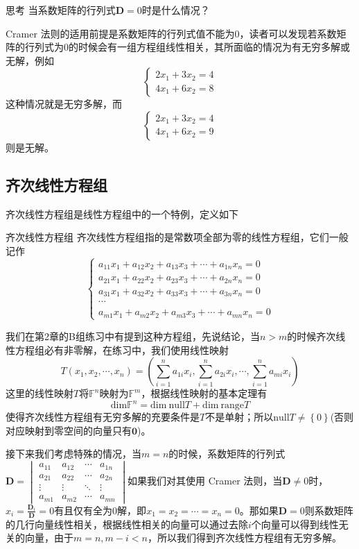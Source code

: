 \begin{ascolorbox1}{思考}
	当系数矩阵的行列式$\mathbf{D}=0$时是什么情况？
\end{ascolorbox1}

Cramer 法则的适用前提是系数矩阵的行列式值不能为0，读者可以发现若系数矩阵的行列式为0的时候会有一组方程组线性相关，其所面临的情况为有无穷多解或无解，例如$$\left\{\begin{matrix} 
	2x_1+3x_2 = 4 \\  
	4x_1+6x_2 = 8
  \end{matrix}\right. $$这种情况就是无穷多解，而$$\left\{\begin{matrix} 
	2x_1+3x_2 = 4 \\  
	4x_1+6x_2 = 9
  \end{matrix}\right. $$则是无解。

\subsection{齐次线性方程组}

齐次线性方程组是线性方程组中的一个特例，定义如下
\begin{definition}{齐次线性方程组}
	齐次线性方程组指的是常数项全部为零的线性方程组，它们一般记作$$\left\{\begin{matrix} 
		a_{11}x_1+a_{12}x_2+a_{13}x_3+\cdots+a_{1n}x_n=0 \\  
		a_{21}x_1+a_{22}x_2+a_{23}x_3+\cdots+a_{2n}x_n=0 \\  
		a_{31}x_1+a_{32}x_2+a_{33}x_3+\cdots+a_{3n}x_n=0 \\
		\cdots \\
		a_{m1}x_1+a_{m2}x_2+a_{m3}x_3+\cdots+a_{mn}x_n=0
	  \end{matrix}\right. $$
\end{definition}

我们在第2章的B组练习中有提到这种方程组，先说结论，当$n>m$的时候齐次线性方程组必有非零解，在练习中，我们使用线性映射$$T(x_1,x_2,\cdots,x_n)=\left( \sum_{i=1}^{n}a_{1i}x_i,\sum_{i=1}^{n}a_{2i}x_i,\cdots,\sum_{i=1}^{n}a_{mi}x_i \right)$$这里的线性映射$T$将$\mathbb{F}^n$映射为$\mathbb{F}^m$，根据线性映射的基本定理有$$\text{dim}\mathbb{F}^n=\text{dim}~\text{null}T+\text{dim}~\text{range}T$$使得齐次线性方程组有无穷多解的充要条件是$T$不是单射；所以$\text{null}T\neq \left\{ 0 \right\}$(否则对应映射到零空间的向量只有$\boldsymbol{0}$)。

接下来我们考虑特殊的情况，当$m=n$的时候，系数矩阵的行列式$\mathbf{D}=\begin{vmatrix}  
	a_{11}& a_{12}& \cdots  & a_{1n} \\  
	a_{21}& a_{22}& \cdots  & a_{2n} \\  
	\vdots & \vdots & \ddots & \vdots \\  
	a_{m1}& a_{m2}& \cdots  & a_{mn}  
  \end{vmatrix}  
$如果我们对其使用 Cramer 法则，当$\mathbf{D}\neq 0$时，$\displaystyle x_i=\frac{\mathbf{D}_i}{\mathbf{D}}=0$有且仅有全为0解，即$x_1=x_2=\cdots=x_n=0$。那如果$\mathbf{D}= 0$则系数矩阵的几行向量线性相关，根据线性相关的向量可以通过去除$i$个向量可以得到线性无关的向量，由于$m=n,m-i<n$，所以我们得到齐次线性方程组有无穷多解。

